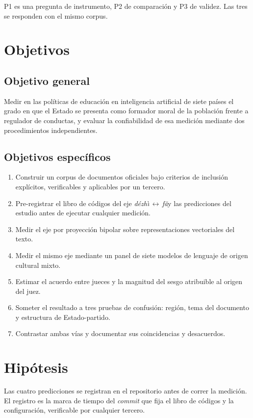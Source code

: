 \documentclass[12pt,letterpaper]{article}
\newcommand{\dezhi}{\textit{d\'ezh\`{\i}}}
\newcommand{\fa}{\textit{f\v{a}}}
\newcommand{\ejedf}{\dezhi\,$\leftrightarrow$\,\fa}
\begin{document}
P1 es una pregunta de instrumento, P2 de comparación y P3 de validez. Las tres se responden con el mismo corpus.


\section{Objetivos}

\subsection{Objetivo general}

Medir en las políticas de educación en inteligencia artificial de siete países el grado en que el Estado se presenta como formador moral de la población frente a regulador de conductas, y evaluar la confiabilidad de esa medición mediante dos procedimientos independientes.

\subsection{Objetivos específicos}

\begin{enumerate}[label=\textbf{OE\arabic*.},leftmargin=1.6cm]
  \item Construir un corpus de documentos oficiales bajo criterios de inclusión explícitos, verificables y aplicables por un tercero.
  \item Pre-registrar el libro de códigos del eje \ejedf y las predicciones del estudio antes de ejecutar cualquier medición.
  \item Medir el eje por proyección bipolar sobre representaciones vectoriales del texto.
  \item Medir el mismo eje mediante un panel de siete modelos de lenguaje de origen cultural mixto.
  \item Estimar el acuerdo entre jueces y la magnitud del sesgo atribuible al origen del juez.
  \item Someter el resultado a tres pruebas de confusión: región, tema del documento y estructura de Estado-partido.
  \item Contrastar ambas vías y documentar sus coincidencias y desacuerdos.
\end{enumerate}


\section{Hipótesis}

Las cuatro predicciones se registran en el repositorio antes de correr la medición. El registro es la marca de tiempo del \textit{commit} que fija el libro de códigos y la configuración, verificable por cualquier tercero.
\end{document}
